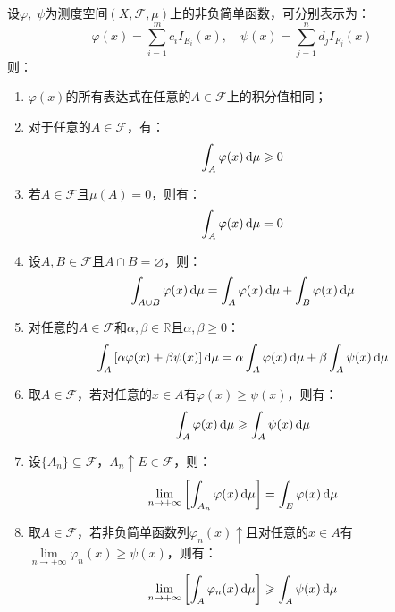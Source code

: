 \begin{property}\label{prop:NonnegativeSimpleIntegral}
	设$\varphi,\;\psi$为测度空间$(X,\mathscr{F},\mu)$上的非负简单函数，可分别表示为：
	\begin{equation*}
		\varphi(x)=\sum_{i=1}^{m}c_iI_{E_i}(x),\quad
		\psi(x)=\sum_{j=1}^{n}d_jI_{F_j}(x)
	\end{equation*}
	则：
	\begin{enumerate}
		\item $\varphi(x)$的所有表达式在任意的$A\in \mathscr{F}$上的积分值相同；
		\item 对于任意的$A\in \mathscr{F}$，有：
		\begin{equation*}
			\int_{A}\varphi(x)\mathop{}\!\mathrm{d} \mu\geqslant0
		\end{equation*}
		\item 若$A\in \mathscr{F}$且$\mu(A)=0$，则有：
		\begin{equation*}
			\int_{A}\varphi(x)\mathop{}\!\mathrm{d}\mu=0
		\end{equation*}
		\item 设$A,B\in \mathscr{F}$且$A\cap B=\varnothing$，则：
		\begin{equation*}
			\int_{A\cup B}\varphi(x)\mathop{}\!\mathrm{d}\mu=\int_{A}\varphi(x)\mathop{}\!\mathrm{d}\mu+\int_{B}\varphi(x)\mathop{}\!\mathrm{d}\mu
		\end{equation*}
		\item 对任意的$A\in \mathscr{F}$和$\alpha,\beta\in \mathbb{R}$且$\alpha,\beta\geqslant0$：
		\begin{equation*}
			\int_{A}\left[\alpha\varphi(x)+\beta\psi(x)\right]\mathop{}\!\mathrm{d}\mu
			=\alpha\int_{A}\varphi(x)\mathop{}\!\mathrm{d}\mu+\beta\int_{A}\psi(x)\mathop{}\!\mathrm{d}\mu
		\end{equation*}
		\item 取$A\in \mathscr{F}$，若对任意的$x\in A$有$\varphi(x)\geqslant \psi(x)$，则有：
		\begin{equation*}
			\int_{A}\varphi(x)\mathop{}\!\mathrm{d}\mu\geqslant\int_{A}\psi(x)\mathop{}\!\mathrm{d}\mu
		\end{equation*}
		\item 设$\{A_n\}\subseteq\mathscr{F}$，$A_n\uparrow E\in \mathscr{F}$，则：
		\begin{equation*}
			\lim_{n\to+\infty}\left[\int_{A_n}\varphi(x)\mathop{}\!\mathrm{d}\mu\right]=\int_{E}\varphi(x)\mathop{}\!\mathrm{d}\mu
		\end{equation*}
		\item 取$A\in \mathscr{F}$，若非负简单函数列$\varphi_n(x)\uparrow$且对任意的$x\in A$有$\lim\limits_{n\to+\infty}\varphi_n(x)\geqslant \psi(x)$，则有：
		\begin{equation*}
			\lim_{n\to+\infty}\left[\int_{A}\varphi_n(x)\mathop{}\!\mathrm{d}\mu\right]\geqslant\int_{A}\psi(x)\mathop{}\!\mathrm{d}\mu
		\end{equation*}
	\end{enumerate}
\end{property}
